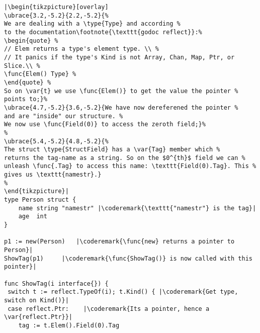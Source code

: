 \begin{lstlisting}[caption=Introspection using reflection,label=src:introspection]
|\begin{tikzpicture}[overlay]
\ubrace{3.2,-5.2}{2.2,-5.2}{%
We are dealing with a \type{Type} and according %
to the documentation\footnote{\texttt{godoc reflect}}:%
\begin{quote} %
// Elem returns a type's element type. \\ %
// It panics if the type's Kind is not Array, Chan, Map, Ptr, or Slice.\\ %
\func{Elem() Type} %
\end{quote} %
So on \var{t} we use \func{Elem()} to get the value the pointer %
points to;}%
\ubrace{4.7,-5.2}{3.6,-5.2}{We have now dereferened the pointer %
and are "inside" our structure. %
We now use \func{Field(0)} to access the zeroth field;}%
%
\ubrace{5.4,-5.2}{4.8,-5.2}{%
The struct \type{StructField} has a \var{Tag} member which %
returns the tag-name as a string. So on the $0^{th}$ field we can %
unleash \func{.Tag} to access this name: \texttt{Field(0).Tag}. This %
gives us \texttt{namestr}.}
%
\end{tikzpicture}|
type Person struct {
    name string "namestr" |\coderemark{\texttt{"namestr"} is the tag}|
    age  int
}

p1 := new(Person)   |\coderemark{\func{new} returns a pointer to Person}|
ShowTag(p1)	    |\coderemark{\func{ShowTag()} is now called with this pointer}|

func ShowTag(i interface{}) {
 switch t := reflect.TypeOf(i); t.Kind() { |\coderemark{Get type, switch on Kind()}|
 case reflect.Ptr:	  |\coderemark{Its a pointer, hence a \var{reflect.Ptr}}|
	tag := t.Elem().Field(0).Tag
\end{lstlisting}
